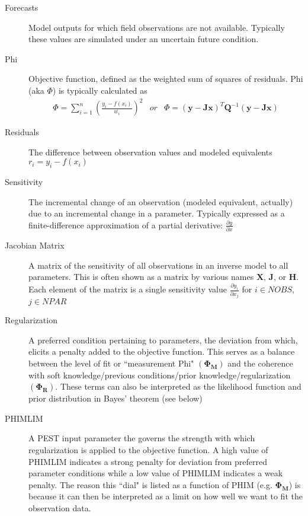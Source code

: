 \documentclass[english]{article}
\begin{document}
\begin{description}
\begin{enumerate}
\end{enumerate}
\item [Forecasts] Model outputs for which field observations are not available. Typically these values are simulated under an uncertain future condition.
\item [Phi] Objective function, defined as the weighted sum of squares of residuals. Phi (aka $\Phi$) is typically calculated as
\begin{equation}
\begin{array}{ccc}
 \Phi=\sum_{i=1}^{n}\left(\frac{y_{i}-f\left(x_{i}\right)}{w_{i}}\right)^{2} & or & \Phi=\left(\mathbf{y}-\mathbf{Jx}\right)^{T}\mathbf{Q}^{-1}\left(\mathbf{y}-\mathbf{Jx}\right)
 \end{array}
\end{equation}
\item [Residuals] The difference between observation values and modeled equivalents $r_i=y_i-f\left(x_i\right)$
\item [Sensitivity] The incremental change of an observation (modeled equivalent, actually) due to an incremental change in a parameter. Typically expressed as a finite-difference approximation of a partial derivative: $\frac{\partial y}{\partial x}$
\item [Jacobian Matrix] A matrix of the sensitivity of all observations in an inverse model to all parameters. This is often shown as a matrix by various names $\mathbf{X}$, $\mathbf{J}$, or $\mathbf{H}$. Each element of the matrix is a single sensitivity value  $\frac{\partial y_i}{\partial x_j}$ for $i\in NOBS$, $j \in NPAR$
\item [Regularization] A preferred condition pertaining to parameters, the deviation from which, elicits a penalty added to the objective function. This serves as a balance between the level of fit or ``measurement Phi"  $(\mathbf{\Phi_M})$ and the coherence with soft knowledge/previous conditions/prior knowledge/regularization $(\mathbf{\Phi_R})$. These terms can also be interpreted as the likelihood function and prior distribution in Bayes' theorem (see below) 
\item [PHIMLIM] A PEST input parameter the governs the strength with which regularization is applied to the objective function. A high value of PHIMLIM indicates a strong penalty for deviation from preferred parameter conditions while a low value of PHIMLIM indicates a weak penalty. The reason this ``dial" is listed as a function of PHIM (e.g. $\mathbf{\Phi_M}$) is because it can then be interpreted as a limit on how well we want to fit the observation data.

\end{description}
\end{document}
